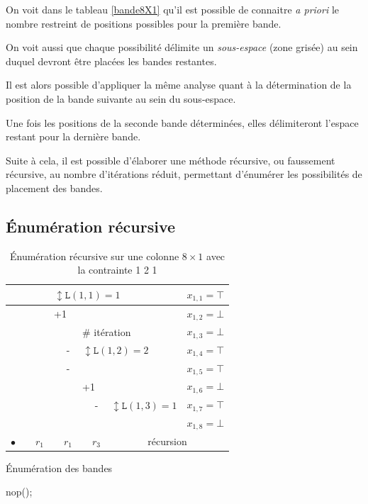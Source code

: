 \documentclass[a4paper,12pt]{report}
\newcommand\black{\cellcolor{black}}
\newcommand\grey{\cellcolor{black!50}}
\begin{document}
On voit dans le tableau \ref{bande8X1} qu'il est possible de connaitre \textit{a priori} le nombre restreint de positions possibles pour la première bande. 

On voit aussi que chaque possibilité délimite un \textit{sous-espace} (zone grisée) au sein duquel devront être placées les bandes restantes.

Il est alors possible d'appliquer la même analyse quant à la détermination de la position de la bande suivante au sein du sous-espace.

Une fois les positions de la seconde bande déterminées, elles délimiteront l'espace restant pour la dernière bande. 

Suite à cela, il est possible d'élaborer une méthode récursive, ou faussement récursive, au nombre d'itérations réduit, permettant d'énumérer les possibilités de placement des bandes.

\subsection{Énumération récursive}
\begin{table}[H]
\centering
\begin{tabular}{|c|c|c|l|c|l|c|c|c|}
\hline 
\grey &&\black & \multicolumn{5}{l|}{$\updownarrow \mathtt{L}(1,1) = 1$}& $x_{1,1}=\top$ \\ 
\hline 
\grey && & \multicolumn{5}{l|}{+1} & $x_{1,2}=\bot$ \\ 
\hline
\grey &&\grey &  &  & \multicolumn{3}{l|}{$\#$ itération}& $x_{1,3}=\bot$ \\ 
\hline 
\grey &&\grey &  & \black - & \multicolumn{3}{l|}{$\updownarrow \mathtt{L}(1,2) = 2$}& $x_{1,4}=\top$ \\ 
\cline{1-5}\cline{9-9}
\grey &&\grey &  & \black - & \multicolumn{3}{l|}{}& $x_{1,5}=\top$\\ 
\hline 
\grey &&\grey &  &  & \multicolumn{3}{l|}{+1} & $x_{1,6}=\bot$\\ 
\hline 
\grey &&\grey &  & \grey &  & \black - & $\updownarrow \mathtt{L}(1,3) = 1$ & $x_{1,7}=\top$ \\ 
\hline 
\grey &&\grey &  & \grey &  &  &  & $x_{1,8}=\bot$\\ 
\hline
\hline 
 $\bullet$&&$r_1$ &  & $r_1$ &  &$r_3$&  \multicolumn{2}{c|}{récursion}\\
\hline
\end{tabular}
\caption{\label{EnumBande} Énumération récursive sur une colonne $8\times1$ avec la contrainte 1 2 1}
\end{table}

 
\begin{algorithm}
\caption{Énumération des bandes}
\begin{algorithmic}
		nop();		
		\EndFor			
\EndFor
\end{algorithmic}
\end{algorithm}

	
						
\end{document}
